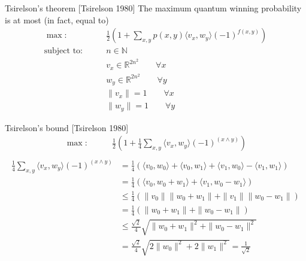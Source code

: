 \documentclass{beamer}
\newcommand\emm[1]{\textcolor{redorange}{{#1}}}
\begin{document}
\begin{frame}{Tsirelson's theorem [Tsirelson 1980]}
\small
The maximum quantum winning probability is \emm{at most (in fact, equal to)}
\begin{align*}
\max\colon\qquad& \frac12\left(1 + \sum_{x,y}p(x,y) \langle v_x, w_y\rangle(-1)^{f(x,y)}\right)\\
\text{subject to}\colon\qquad&
n\in\mathbb{N}\\
&v_x \in \mathbb{R}^{2n^2}\qquad \forall x\\
&w_y \in \mathbb{R}^{2n^2}\qquad \forall y\\
&\|v_x\| = 1\qquad \forall x\\
&\|w_y\| = 1\qquad \forall y
\end{align*}
\end{frame}

\begin{frame}{Tsirelson's bound [Tsirelson 1980]}
\small
\begin{align*}
\max\colon\qquad& \frac12\left(1 + \frac14\sum_{x,y} \langle v_x, w_y\rangle(-1)^{(x\wedge y)}\right)\\
\end{align*}
\begin{align*}
\frac14\sum_{x,y} \langle v_x, w_y\rangle(-1)^{(x\wedge y)}
&= \frac14\left(\langle v_0, w_0\rangle + \langle v_0, w_1\rangle + \langle v_1, w_0\rangle - \langle v_1, w_1\rangle\right)\\
&= \frac14\left(\langle v_0, w_0 + w_1\rangle + \langle v_1, w_0 - w_1\rangle\right)\\
&\le \frac14\left(\|v_0\|\|w_0 + w_1\| + \| v_1\|\|w_0 - w_1\|\right)\\
&= \frac14\left(\|w_0 + w_1\| + \|w_0 - w_1\|\right)\\
&\le \frac{\sqrt{2}}4\sqrt{\|w_0 + w_1\|^2 + \|w_0 - w_1\|^2}\\
&= \frac{\sqrt{2}}4\sqrt{2\|w_0\|^2 + 2\|w_1\|^2}
=\frac1{\sqrt{2}}
\end{align*}
\end{frame}

\end{document}
